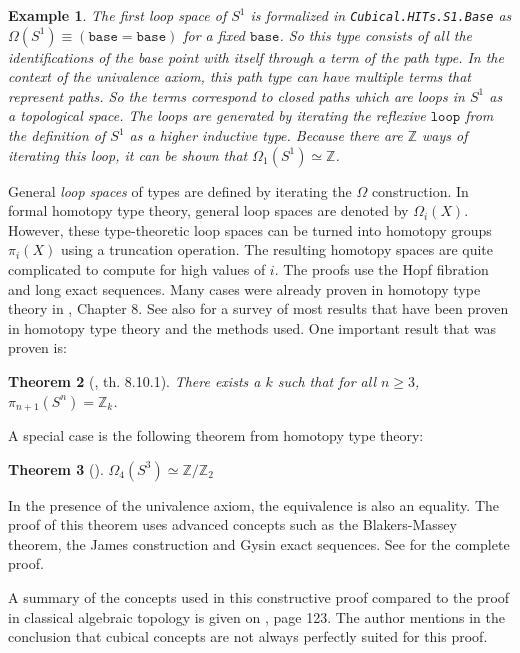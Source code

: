 \documentclass[12pt,a4paper,twoside,xetex]{book}
\newcommand{\keyword}[1]{\emph{#1}\index{#1}}
\newtheorem{theorem}{Theorem}[section]
\newtheorem{example}[theorem]{Example}
\newcommand{\op}[1]{\mathtt{#1}}
\begin{document}
\begin{example}
The first loop space of $S^1$ is formalized in \texttt{Cubical.HITs.S1.Base} 
as $\Omega (S^1) \equiv (\op{base} = \op{base})$ for a fixed
$\op{base}$. So this type consists of all the identifications of the base 
point with itself through a term of the path type. In the context of the 
univalence axiom, this path type can have multiple terms that represent paths. 
So the terms correspond to closed paths which are loops in $S^1$ as a 
topological space. The loops are generated by iterating the reflexive 
$\op{loop}$ from the definition of $S^1$ as a higher inductive type. Because 
there are $\mathbb{Z}$ ways of iterating this loop, it can be shown that 
$\Omega_1 (S^1) \simeq \mathbb{Z}$. 
\end{example}


General \keyword{loop spaces} of types 
are defined by iterating the $\Omega$ construction. In formal homotopy type 
theory, general loop spaces are denoted by $\Omega_i (X)$. However, these type-theoretic loop spaces can be turned into homotopy groups $\pi_i(X)$ using a truncation operation. 
The resulting homotopy spaces are quite complicated to compute for high values of $i$. The proofs use the Hopf fibration and long exact sequences. Many cases were already proven in homotopy type theory in \cite{Voevodsky2013}, Chapter 8. See also \cite{Licata2013May} for a survey of most results that have been proven in 
homotopy type theory and the methods used. One important result that was proven 
is:

\begin{theorem}[\cite{Voevodsky2013}, th. 8.10.1]
 There exists a $k$ such that for all $n \geq 3$, $\pi_{n+1}(S^n) = 
\mathbb{Z}_k$.
\end{theorem}

A special case is the following theorem from homotopy type theory:

\begin{theorem}[\cite{Brunerie2016}]
$\Omega_4 ( S^3 ) \simeq \mathbb{Z} / \mathbb{Z}_2$
\end{theorem}

In the presence of the univalence axiom, the equivalence is also an equality. The proof of this theorem uses advanced concepts such as the Blakers-Massey 
theorem, the James construction and Gysin exact sequences. See 
\cite{Brunerie2016} for the complete proof.

A summary of the concepts used in this constructive proof compared to the proof 
in classical algebraic topology is given on \cite{Brunerie2016}, page 123. The 
author mentions in the conclusion that cubical concepts are not always perfectly 
suited for this proof. 
\end{document}
